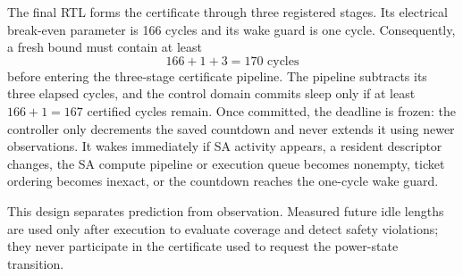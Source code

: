 The final RTL forms the certificate through three registered stages. Its
electrical break-even parameter is 166 cycles and its wake guard is one
cycle. Consequently, a fresh bound must contain at least
\begin{equation}
  166 + 1 + 3 = 170 \text{ cycles}
  \label{eq:pipelined-entry-threshold}
\end{equation}
before entering the three-stage certificate pipeline. The pipeline subtracts
its three elapsed cycles, and the control domain commits sleep only if at
least $166+1=167$ certified cycles remain. Once committed, the deadline is
frozen: the controller only decrements the saved countdown and never extends
it using newer observations. It wakes immediately if SA activity appears, a
resident descriptor changes, the SA compute pipeline or execution queue
becomes nonempty, ticket ordering becomes inexact, or the countdown reaches
the one-cycle wake guard.

This design separates prediction from observation. Measured future idle
lengths are used only after execution to evaluate coverage and detect safety
violations; they never participate in the certificate used to request the
power-state transition.
